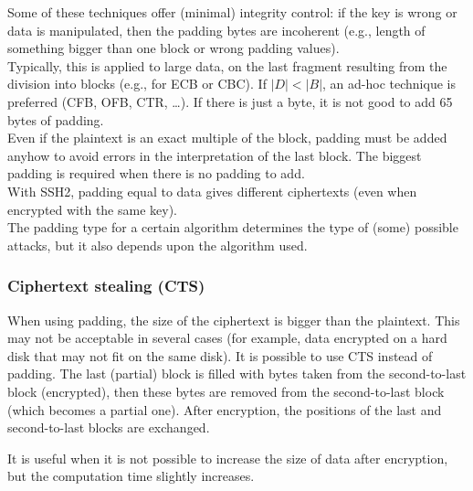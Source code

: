 Some of these techniques offer (minimal) integrity control: if the key is wrong or data is manipulated, then the
padding bytes are incoherent (e.g., length of something bigger than one block or wrong padding values).\\
Typically, this is applied to large data, on the last fragment resulting from the division into blocks (e.g., for ECB
or CBC). If $|D| < |B|$, an ad-hoc technique is preferred (CFB, OFB, CTR, …). If there is just a byte, it is not
good to add 65 bytes of padding.\\
Even if the plaintext is an exact multiple of the block, padding must be added anyhow to avoid errors in the
interpretation of the last block. The biggest padding is required when there is no padding to add.\\
With SSH2, padding equal to data gives different ciphertexts (even when encrypted with the same key).\\
The padding type for a certain algorithm determines the type of (some) possible attacks, but it also depends
upon the algorithm used.

\subsubsection{Ciphertext stealing (CTS)}
When using padding, the size of the ciphertext is bigger than the plaintext. This may not be acceptable in
several cases (for example, data encrypted on a hard disk that may not fit on the same disk). It is possible to use
CTS instead of padding. The last (partial) block is filled with bytes taken from the second-to-last block
(encrypted), then these bytes are removed from the second-to-last block (which becomes a partial one). After
encryption, the positions of the last and second-to-last blocks are exchanged.

It is useful when it is not possible to increase the size of data after encryption, but the computation time slightly increases.


